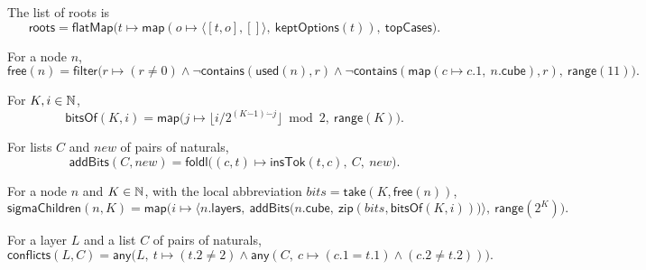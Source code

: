 \begin{definition}\label{cb:def:roots}
The list of roots is
\[
\mathsf{roots}=\mathsf{flatMap}\big(t\mapsto\mathsf{map}(o\mapsto\langle[t,o],[]\rangle,\ \mathsf{keptOptions}(t)),\
\mathsf{topCases}\big).
\]
\end{definition}

\begin{definition}\label{cb:def:free}
For a node $n$,
\[
\mathsf{free}(n)=\mathsf{filter}\big(r\mapsto(r\ne0)\wedge\neg\mathsf{contains}(\mathsf{used}(n),r)\wedge
\neg\mathsf{contains}(\mathsf{map}(c\mapsto c.1,\ n.\mathsf{cube}),r),\ \mathsf{range}(11)\big).
\]
\end{definition}

\begin{definition}\label{cb:def:bitsof}
For $K,i\in\mathbb N$,
\[
\mathsf{bitsOf}(K,i)=\mathsf{map}\big(j\mapsto\lfloor i/2^{(K\mathbin{\dot-}1)\mathbin{\dot-}j}\rfloor\bmod2,\
\mathsf{range}(K)\big).
\]
\end{definition}

\begin{definition}\label{cb:def:addbits}
For lists $C$ and $new$ of pairs of naturals,
\[
\mathsf{addBits}(C,new)=\mathsf{foldl}\big((c,t)\mapsto\mathsf{insTok}(t,c),\ C,\ new\big).
\]
\end{definition}

\begin{definition}\label{cb:def:sigmachildren}
For a node $n$ and $K\in\mathbb N$, with the local abbreviation $bits=\mathsf{take}(K,\mathsf{free}(n))$,
\[
\mathsf{sigmaChildren}(n,K)=\mathsf{map}\Big(i\mapsto\big\langle n.\mathsf{layers},\
\mathsf{addBits}\big(n.\mathsf{cube},\ \mathsf{zip}(bits,\mathsf{bitsOf}(K,i))\big)\big\rangle,\
\mathsf{range}(2^K)\Big).
\]
\end{definition}

\begin{definition}\label{cb:def:conflicts}
For a layer $L$ and a list $C$ of pairs of naturals,
\[
\mathsf{conflicts}(L,C)=\mathsf{any}\big(L,\ t\mapsto(t.2\ne2)\wedge\mathsf{any}(C,\ c\mapsto(c.1=t.1)\wedge(c.2\ne
t.2))\big).
\]
\end{definition}

